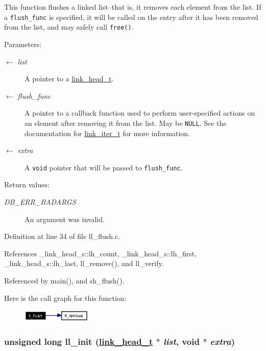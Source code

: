 This function flushes a linked list--that is, it removes each element from the list. If a {\tt flush\_\-func} is specified, it will be called on the entry after it has been removed from the list, and may safely call {\tt free()}.

\begin{Desc}
\item[Parameters:]
\begin{description}
\item[\mbox{$\leftarrow$} {\em list}]A pointer to a \hyperlink{group__dbprim__link_ga0}{link\_\-head\_\-t}. \item[\mbox{$\leftarrow$} {\em flush\_\-func}]A pointer to a callback function used to perform user-specified actions on an element after removing it from the list. May be {\tt NULL}. See the documentation for \hyperlink{group__dbprim__link_ga2}{link\_\-iter\_\-t} for more information. \item[\mbox{$\leftarrow$} {\em extra}]A {\tt void} pointer that will be passed to {\tt flush\_\-func}.\end{description}
\end{Desc}
\begin{Desc}
\item[Return values:]
\begin{description}
\item[{\em DB\_\-ERR\_\-BADARGS}]An argument was invalid.\end{description}
\end{Desc}


Definition at line 34 of file ll\_\-flush.c.

References \_\-link\_\-head\_\-s::lh\_\-count, \_\-link\_\-head\_\-s::lh\_\-first, \_\-link\_\-head\_\-s::lh\_\-last, ll\_\-remove(), and ll\_\-verify.

Referenced by main(), and sh\_\-flush().

Here is the call graph for this function:\begin{figure}[H]
\begin{center}
\leavevmode
\includegraphics[width=94pt]{group__dbprim__link_ga11_cgraph}
\end{center}
\end{figure}
\hypertarget{group__dbprim__link_ga5}{
\subsubsection[ll\_\-init]{\setlength{\rightskip}{0pt plus 5cm}unsigned long ll\_\-init (\hyperlink{struct__link__head__s}{link\_\-head\_\-t} $\ast$ {\em list}, void $\ast$ {\em extra})}}
\label{group__dbprim__link_ga5}


